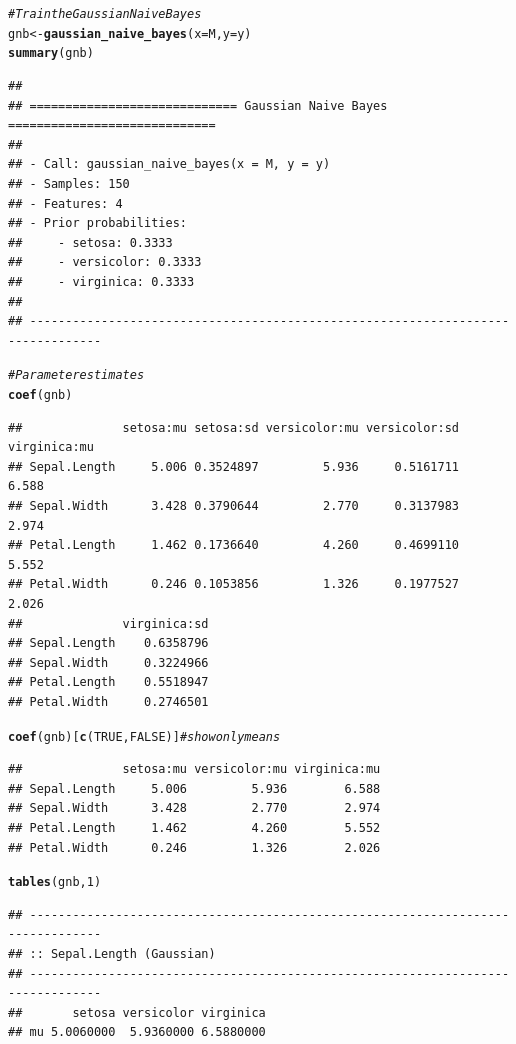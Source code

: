 \documentclass{article}\usepackage[]{graphicx}\usepackage[]{xcolor}
\makeatletter
\newcommand{\hlnum}[1]{\textcolor[rgb]{0.686,0.059,0.569}{#1}}%
\newcommand{\hlcom}[1]{\textcolor[rgb]{0.678,0.584,0.686}{\textit{#1}}}%
\newcommand{\hlstd}[1]{\textcolor[rgb]{0.345,0.345,0.345}{#1}}%
\newcommand{\hlkwb}[1]{\textcolor[rgb]{0.69,0.353,0.396}{#1}}%
\newcommand{\hlkwc}[1]{\textcolor[rgb]{0.333,0.667,0.333}{#1}}%
\newcommand{\hlkwd}[1]{\textcolor[rgb]{0.737,0.353,0.396}{\textbf{#1}}}%
\newenvironment{kframe}{%
 \def\at@end@of@kframe{}%
 \ifinner\ifhmode%
  \def\at@end@of@kframe{\end{minipage}}%
  \begin{minipage}{\columnwidth}%
 \fi\fi%
 \def\FrameCommand##1{\hskip\@totalleftmargin \hskip-\fboxsep
 \colorbox{shadecolor}{##1}\hskip-\fboxsep
     \hskip-\linewidth \hskip-\@totalleftmargin \hskip\columnwidth}%
 \MakeFramed {\advance\hsize-\width
   \@totalleftmargin\z@ \linewidth\hsize
   \@setminipage}}%
 {\par\unskip\endMakeFramed%
 \at@end@of@kframe}
\newenvironment{knitrout}{}{} %
\makeatother
\begin{document}
\begin{knitrout}
\begin{kframe}
\begin{alltt}
\hlcom{# Train the Gaussian Naive Bayes}
\hlstd{gnb} \hlkwb{<-} \hlkwd{gaussian_naive_bayes}\hlstd{(}\hlkwc{x} \hlstd{= M,} \hlkwc{y} \hlstd{= y)}
\hlkwd{summary}\hlstd{(gnb)}
\end{alltt}
\begin{verbatim}
## 
## ============================= Gaussian Naive Bayes ============================= 
##  
## - Call: gaussian_naive_bayes(x = M, y = y) 
## - Samples: 150 
## - Features: 4 
## - Prior probabilities: 
##     - setosa: 0.3333
##     - versicolor: 0.3333
##     - virginica: 0.3333
## 
## --------------------------------------------------------------------------------
\end{verbatim}
\begin{alltt}
\hlcom{# Parameter estimates}
\hlkwd{coef}\hlstd{(gnb)}
\end{alltt}
\begin{verbatim}
##              setosa:mu setosa:sd versicolor:mu versicolor:sd virginica:mu
## Sepal.Length     5.006 0.3524897         5.936     0.5161711        6.588
## Sepal.Width      3.428 0.3790644         2.770     0.3137983        2.974
## Petal.Length     1.462 0.1736640         4.260     0.4699110        5.552
## Petal.Width      0.246 0.1053856         1.326     0.1977527        2.026
##              virginica:sd
## Sepal.Length    0.6358796
## Sepal.Width     0.3224966
## Petal.Length    0.5518947
## Petal.Width     0.2746501
\end{verbatim}
\begin{alltt}
\hlkwd{coef}\hlstd{(gnb)[}\hlkwd{c}\hlstd{(}\hlnum{TRUE}\hlstd{,} \hlnum{FALSE}\hlstd{)]} \hlcom{# show only means}
\end{alltt}
\begin{verbatim}
##              setosa:mu versicolor:mu virginica:mu
## Sepal.Length     5.006         5.936        6.588
## Sepal.Width      3.428         2.770        2.974
## Petal.Length     1.462         4.260        5.552
## Petal.Width      0.246         1.326        2.026
\end{verbatim}
\begin{alltt}
\hlkwd{tables}\hlstd{(gnb,} \hlnum{1}\hlstd{)}
\end{alltt}
\begin{verbatim}
## -------------------------------------------------------------------------------- 
## :: Sepal.Length (Gaussian) 
## -------------------------------------------------------------------------------- 
##       setosa versicolor virginica
## mu 5.0060000  5.9360000 6.5880000

\end{verbatim}
\end{kframe}
\end{knitrout}
\end{document}
